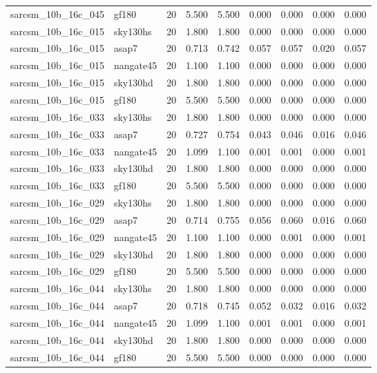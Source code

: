 \begin{tabular}{llrrrrrrr}
sarcsm\_10b\_16c\_045 & gf180 & 20 & 5.500 & 5.500 & 0.000 & 0.000 & 0.000 & 0.000 \\
sarcsm\_10b\_16c\_015 & sky130hs & 20 & 1.800 & 1.800 & 0.000 & 0.000 & 0.000 & 0.000 \\
sarcsm\_10b\_16c\_015 & asap7 & 20 & 0.713 & 0.742 & 0.057 & 0.057 & 0.020 & 0.057 \\
sarcsm\_10b\_16c\_015 & nangate45 & 20 & 1.100 & 1.100 & 0.000 & 0.000 & 0.000 & 0.000 \\
sarcsm\_10b\_16c\_015 & sky130hd & 20 & 1.800 & 1.800 & 0.000 & 0.000 & 0.000 & 0.000 \\
sarcsm\_10b\_16c\_015 & gf180 & 20 & 5.500 & 5.500 & 0.000 & 0.000 & 0.000 & 0.000 \\
sarcsm\_10b\_16c\_033 & sky130hs & 20 & 1.800 & 1.800 & 0.000 & 0.000 & 0.000 & 0.000 \\
sarcsm\_10b\_16c\_033 & asap7 & 20 & 0.727 & 0.754 & 0.043 & 0.046 & 0.016 & 0.046 \\
sarcsm\_10b\_16c\_033 & nangate45 & 20 & 1.099 & 1.100 & 0.001 & 0.001 & 0.000 & 0.001 \\
sarcsm\_10b\_16c\_033 & sky130hd & 20 & 1.800 & 1.800 & 0.000 & 0.000 & 0.000 & 0.000 \\
sarcsm\_10b\_16c\_033 & gf180 & 20 & 5.500 & 5.500 & 0.000 & 0.000 & 0.000 & 0.000 \\
sarcsm\_10b\_16c\_029 & sky130hs & 20 & 1.800 & 1.800 & 0.000 & 0.000 & 0.000 & 0.000 \\
sarcsm\_10b\_16c\_029 & asap7 & 20 & 0.714 & 0.755 & 0.056 & 0.060 & 0.016 & 0.060 \\
sarcsm\_10b\_16c\_029 & nangate45 & 20 & 1.100 & 1.100 & 0.000 & 0.001 & 0.000 & 0.001 \\
sarcsm\_10b\_16c\_029 & sky130hd & 20 & 1.800 & 1.800 & 0.000 & 0.000 & 0.000 & 0.000 \\
sarcsm\_10b\_16c\_029 & gf180 & 20 & 5.500 & 5.500 & 0.000 & 0.000 & 0.000 & 0.000 \\
sarcsm\_10b\_16c\_044 & sky130hs & 20 & 1.800 & 1.800 & 0.000 & 0.000 & 0.000 & 0.000 \\
sarcsm\_10b\_16c\_044 & asap7 & 20 & 0.718 & 0.745 & 0.052 & 0.032 & 0.016 & 0.032 \\
sarcsm\_10b\_16c\_044 & nangate45 & 20 & 1.099 & 1.100 & 0.001 & 0.001 & 0.000 & 0.001 \\
sarcsm\_10b\_16c\_044 & sky130hd & 20 & 1.800 & 1.800 & 0.000 & 0.000 & 0.000 & 0.000 \\
sarcsm\_10b\_16c\_044 & gf180 & 20 & 5.500 & 5.500 & 0.000 & 0.000 & 0.000 & 0.000 \\

\end{tabular}
